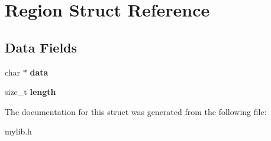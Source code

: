 \hypertarget{struct_region}{}\section{Region Struct Reference}
\label{struct_region}
\subsection*{Data Fields}
\begin{DoxyCompactItemize}
\item 
\mbox{\label{struct_region_a91a70b77df95bd8b0830b49a094c2acb}} 
char $\ast$ {\bfseries data}
\item 
\mbox{\label{struct_region_ae809d5359ac030c60a30a8f0b2294b82}} 
size\+\_\+t {\bfseries length}
\end{DoxyCompactItemize}


The documentation for this struct was generated from the following file\+:\begin{DoxyCompactItemize}
\item 
mylib.\+h\end{DoxyCompactItemize}
